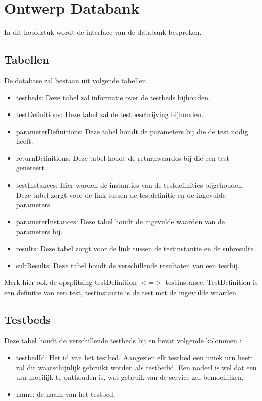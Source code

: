 \newpage
\chapter{Ontwerp Databank}
In dit hoofdstuk wordt de interface van de databank besproken.

\section{Tabellen}
De database zal bestaan uit volgende tabellen.
\begin{itemize}
\item testbeds: Deze tabel zal informatie over de testbeds bijhouden.

\item testDefinitions: Deze tabel zal de testbeschrijving bijhouden.
\item parameterDefinitions: Deze tabel houdt de parameters bij die de test nodig heeft.
\item returnDefinitions: Deze tabel houdt de returnwaardes bij die een test genereert.

\item testInstances: Hier worden de instanties van de testdefinities bijgehouden. Deze tabel zorgt voor de link tussen de testdefinitie en de ingevulde parameters.
\item parameterInstances: Deze tabel houdt de ingevulde waarden van de parameters bij.

\item results: Deze tabel zorgt voor de link tussen de testinstantie en de subresults.
\item subResults: Deze tabel houdt de verschillende resultaten van een testbij.
\end{itemize}

Merk hier ook de opsplitsing testDefinition $<$=$>$ testInstance. TestDefinition is een definitie van een test, testinstantie is de test met de ingevulde waarden.

\section{Testbeds}
Deze tabel houdt de verschillende testbeds bij en bevat volgende kolommen :
\begin{itemize}
\item testbedId: Het id van het testbed. Aangezien elk testbed een uniek urn heeft zal dit waarschijnlijk gebruikt worden als testbedid. Een nadeel is wel dat een urn moeilijk te onthouden is, wat gebruik van de service zal bemoeilijken.
\item name: de naam van het testbed.
\end{itemize}


